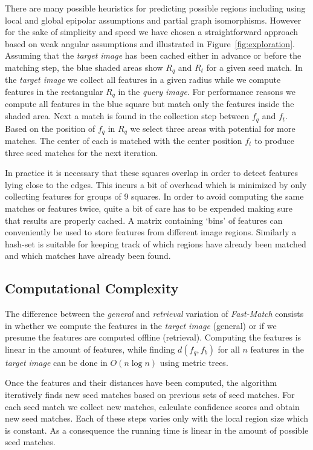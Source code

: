 \documentclass[runningheads]{llncs}
\begin{document}
There are many possible heuristics for predicting possible regions including using local and global epipolar assumptions and partial graph isomorphisms. However for the sake of simplicity and speed we have chosen a straightforward approach based on weak angular assumptions and illustrated in Figure~\ref{fig:exploration}. Assuming that the \emph{target image} has been cached either in advance or before the matching step, the blue shaded areas show $R_q$ and $R_t$ for a given seed match. In the \emph{target image} we collect all features in a given radius while we compute features in the rectangular $R_q$ in the \emph{query image}. For performance reasons we compute all features in the blue square but match only the features inside the shaded area. Next a match is found in the collection step between $f_q$ and $f_t$. Based on the position of $f_q$ in $R_q$ we select three areas with potential for more matches. The center of each is matched with the center position $f_t$ to produce three seed matches for the next iteration.

In practice it is necessary that these squares overlap in order to detect features lying close to the edges. This incurs a bit of overhead which is minimized by only collecting features for groups of 9 squares. In order to avoid computing the same matches or features twice, quite a bit of care has to be expended making sure that results are properly cached. A matrix containing `bins' of features can conveniently be used to store features from different image regions. Similarly a hash-set is suitable for keeping track of which regions have already been matched and which matches have already been found.

\subsection{Computational Complexity}
\label{complexity}
The difference between the \emph{general} and \emph{retrieval} variation of \emph{Fast-Match} consists in whether we compute the features in the \emph{target image} (general) or if we presume the features are computed offline (retrieval). Computing the features is linear in the amount of features, while finding $d(f_q, f_b)$ for all $n$ features in the \emph{target image} can be done in $O(n\log n)$ using metric trees. 

Once the features and their distances have been computed, the algorithm iteratively finds new seed matches based on previous sets of seed matches. For each seed match we collect new matches, calculate confidence scores and obtain new seed matches. Each of these steps varies only with the local region size which is constant. As a consequence the running time is linear in the amount of possible seed matches.
\end{document}
